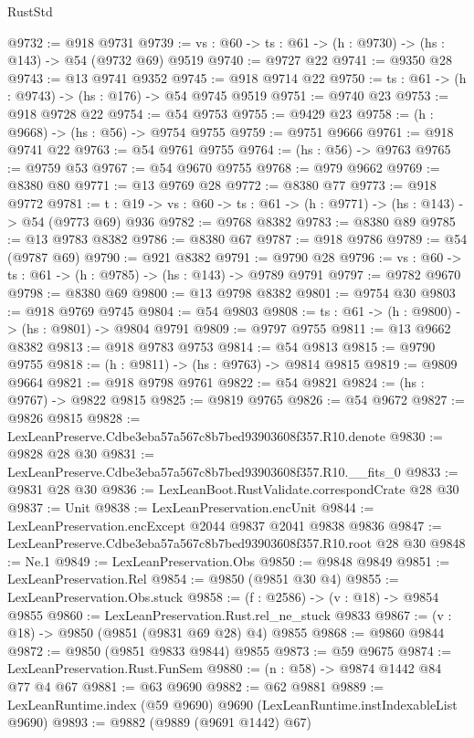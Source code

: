\begin{lexlean}{RustStd}
\begin{coremodule}
@9732 := @918 @9731
@9739 := {vs : @60} -> {ts : @61} -> (h : @9730) -> (hs : @143) -> @54 (@9732 @69) @9519
@9740 := @9727 @22
@9741 := @9350 @28
@9743 := @13 @9741 @9352
@9745 := @918 @9714 @22
@9750 := {ts : @61} -> (h : @9743) -> (hs : @176) -> @54 @9745 @9519
@9751 := @9740 @23
@9753 := @918 @9728 @22
@9754 := @54 @9753
@9755 := @9429 @23
@9758 := (h : @9668) -> (hs : @56) -> @9754 @9755
@9759 := @9751 @9666
@9761 := @918 @9741 @22
@9763 := @54 @9761 @9755
@9764 := (hs : @56) -> @9763
@9765 := @9759 @53
@9767 := @54 @9670 @9755
@9768 := @979 @9662
@9769 := @8380 @80
@9771 := @13 @9769 @28
@9772 := @8380 @77
@9773 := @918 @9772
@9781 := {t : @19} -> {vs : @60} -> {ts : @61} -> (h : @9771) -> (hs : @143) -> @54 (@9773 @69) @936
@9782 := @9768 @8382
@9783 := @8380 @89
@9785 := @13 @9783 @8382
@9786 := @8380 @67
@9787 := @918 @9786
@9789 := @54 (@9787 @69)
@9790 := @921 @8382
@9791 := @9790 @28
@9796 := {vs : @60} -> {ts : @61} -> (h : @9785) -> (hs : @143) -> @9789 @9791
@9797 := @9782 @9670
@9798 := @8380 @69
@9800 := @13 @9798 @8382
@9801 := @9754 @30
@9803 := @918 @9769 @9745
@9804 := @54 @9803
@9808 := {ts : @61} -> (h : @9800) -> (hs : @9801) -> @9804 @9791
@9809 := @9797 @9755
@9811 := @13 @9662 @8382
@9813 := @918 @9783 @9753
@9814 := @54 @9813
@9815 := @9790 @9755
@9818 := (h : @9811) -> (hs : @9763) -> @9814 @9815
@9819 := @9809 @9664
@9821 := @918 @9798 @9761
@9822 := @54 @9821
@9824 := (hs : @9767) -> @9822 @9815
@9825 := @9819 @9765
@9826 := @54 @9672
@9827 := @9826 @9815
@9828 := LexLeanPreserve.Cdbe3eba57a567c8b7bed93903608f357.R10.denote
@9830 := @9828 @28 @30
@9831 := LexLeanPreserve.Cdbe3eba57a567c8b7bed93903608f357.R10.__fits_0
@9833 := @9831 @28 @30
@9836 := LexLeanBoot.RustValidate.correspondCrate @28 @30
@9837 := Unit
@9838 := LexLeanPreservation.encUnit
@9844 := LexLeanPreservation.encExcept @2044 @9837 @2041 @9838 @9836
@9847 := LexLeanPreserve.Cdbe3eba57a567c8b7bed93903608f357.R10.root @28 @30
@9848 := Ne.{1}
@9849 := LexLeanPreservation.Obs
@9850 := @9848 @9849
@9851 := LexLeanPreservation.Rel
@9854 := @9850 (@9851 @30 @4)
@9855 := LexLeanPreservation.Obs.stuck
@9858 := (f : @2586) -> (v : @18) -> @9854 @9855
@9860 := LexLeanPreservation.Rust.rel_ne_stuck @9833
@9867 := (v : @18) -> @9850 (@9851 (@9831 @69 @28) @4) @9855
@9868 := @9860 @9844
@9872 := @9850 (@9851 @9833 @9844) @9855
@9873 := @59 @9675
@9874 := LexLeanPreservation.Rust.FunSem
@9880 := (n : @58) -> @9874 @1442 @84 @77 @4 @67
@9881 := @63 @9690
@9882 := @62 @9881
@9889 := LexLeanRuntime.index (@59 @9690) @9690 (LexLeanRuntime.instIndexableList @9690)
@9893 := @9882 (@9889 (@9691 @1442) @67)

\end{coremodule}
\end{lexlean}

